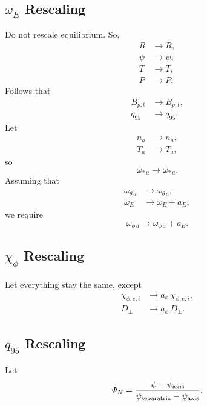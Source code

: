 \documentclass[12pt]{article}
\begin{document}
\subsection{$\omega_E$ Rescaling}
Do not rescale equilibrium. So,
\begin{align}
R&\rightarrow R,\\[0.5ex]
\psi&\rightarrow\psi,\\[0.5ex]
T&\rightarrow T,\\[0.5ex]
P&\rightarrow P.
\end{align}
Follows that
\begin{align}
B_{p,t}&\rightarrow B_{p,t},\\[0.5ex]
q_{95}&\rightarrow q_{95}.
\end{align}
Let
\begin{align}
n_a&\rightarrow n_a,\\[0.5ex]
T_a&\rightarrow T_a,
\end{align}
so
\begin{equation}
\omega_{\ast\,a} \rightarrow \omega_{\ast\,a}.
\end{equation}
Assuming that
\begin{align}
\omega_{\theta\,a}&\rightarrow \omega_{\theta\,a},\\[0.5ex]
\omega_E &\rightarrow \omega_E +a_E,
\end{align}
we require 
\begin{equation}
\omega_{\phi\,a}\rightarrow \omega_{\phi\,a} + a_E.
\end{equation}

\subsection{$\chi_\phi$ Rescaling}
Let everything stay the same, except
\begin{align}
\chi_{\phi,e,i} & \rightarrow a_\phi\,\chi_{\phi,e,i},\\[0.5ex]
D_\perp & \rightarrow a_\phi\,D_\perp.
\end{align}

\subsection{$q_{95}$ Rescaling}
Let
\begin{equation}
{\mit\Psi}_N = \frac{\psi - \psi_{\rm axis}}{\psi_{\rm separatrix}-\psi_{\rm axis}}.
\end{equation}
\end{document}
